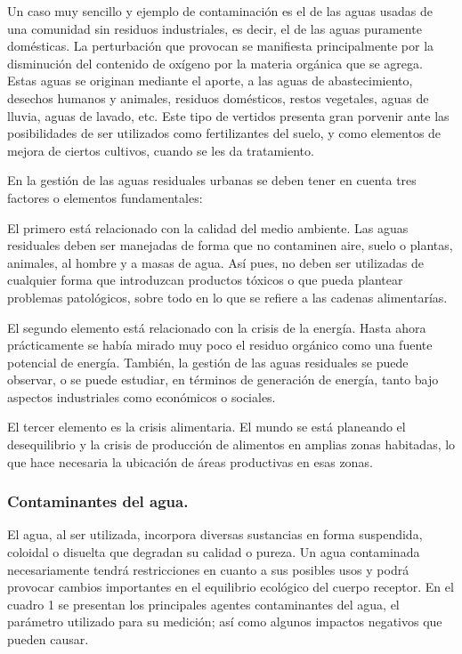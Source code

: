 Un caso muy sencillo y ejemplo de contaminación es el de las aguas usadas de
una comunidad sin residuos industriales, es decir, el de las aguas puramente
domésticas. La perturbación que provocan se manifiesta principalmente por la
disminución del contenido de oxígeno por la materia orgánica que se agrega. Estas
aguas se originan mediante el aporte, a las aguas de abastecimiento, desechos
humanos y animales, residuos domésticos, restos vegetales, aguas de lluvia, aguas de
lavado, etc. Este tipo de vertidos presenta gran porvenir ante las posibilidades de ser
utilizados como fertilizantes del suelo, y como elementos de mejora de ciertos cultivos,
cuando se les da tratamiento.

En la gestión de las aguas residuales urbanas se deben tener en cuenta tres
factores o elementos fundamentales:

El primero está relacionado con la calidad del medio ambiente. Las aguas
residuales deben ser manejadas de forma que no contaminen aire, suelo o plantas,
animales, al hombre y a masas de agua. Así pues, no deben ser utilizadas de cualquier
forma que introduzcan productos tóxicos o que pueda plantear problemas patológicos,
sobre todo en lo que se refiere a las cadenas alimentarías.

El segundo elemento está relacionado con la crisis de la energía. Hasta ahora
prácticamente se había mirado muy poco el residuo orgánico como una fuente potencial
de energía. También, la gestión de las aguas residuales se puede observar, o se puede
estudiar, en términos de generación de energía, tanto bajo aspectos industriales como
económicos o sociales.

El tercer elemento es la crisis alimentaria. El mundo se está planeando el
desequilibrio y la crisis de producción de alimentos en amplias zonas habitadas, lo que
hace necesaria la ubicación de áreas productivas en esas zonas.

\subsubsection{Contaminantes del agua.}
El agua, al ser utilizada, incorpora diversas sustancias en forma suspendida,
coloidal o disuelta que degradan su calidad o pureza. Un agua contaminada
necesariamente tendrá restricciones en cuanto a sus posibles usos y podrá provocar
cambios importantes en el equilibrio ecológico del cuerpo receptor. En el cuadro 1 se
presentan los principales agentes contaminantes del agua, el parámetro utilizado para
su medición; así como algunos impactos negativos que pueden causar.

